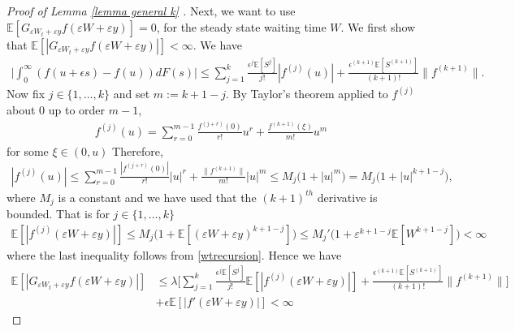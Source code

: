 \documentclass[11pt,letterpaper,reqno]{article}
\theoremstyle{thmstyleone}%
\theoremstyle{thmstyletwo}%
\theoremstyle{thmstylethree}%
\numberwithin{equation}{section}
\begin{document}
\begin{proof}[Proof of Lemma \ref{lemma general k} ]
Next, we want to use $ \mathbb E[G_{\varepsilon W_t+\varepsilon y}f(\varepsilon W+\varepsilon y) ]=0$, for the steady state waiting time $W$. We first show that $ \mathbb E[|G_{\varepsilon W_t+\varepsilon y}f(\varepsilon W+\varepsilon y)| ] < \infty$. We have 
\begin{align*}
    \bigg|\int_0^\infty (f(u+\epsilon s)-f(u)) dF(s) \bigg| \leq \sum_{j=1}^k \frac{\epsilon^j \mathbb E[S^j]}{j!}|f^{(j)}(u)|+\frac{\epsilon^{(k+1)}\mathbb E[S^{(k+1)}]}{(k+1)!}\|f^{(k+1)}\|.
\end{align*} 
Now fix $j\in\{1,\dots,k\}$ and set $m := k+1-j$. By Taylor’s theorem applied to $f^{(j)}$ about $0$ up to order $m-1$,
\begin{align*}  
    f^{(j)}(u)
    = \sum_{r=0}^{m-1} \frac{f^{(j+r)}(0)}{r!}u^r
      + \frac{f^{(k+1)}(\xi)}{m!}u^m
\end{align*}
for some $\xi \in (0,u)$
Therefore,
\begin{align*}
      |f^{(j)}(u)|
    \leq \sum_{r=0}^{m-1} \frac{|f^{(j+r)}(0)|}{r!}|u|^r
         + \frac{\|f^{(k+1)}\|}{m!}|u|^{m}
    \leq M_j\big(1+|u|^{m}\big)
    = M_j\big(1+|u|^{k+1-j}\big),
\end{align*}
where $M_j$ is a constant and we have used that the $(k+1)^{th}$ derivative is bounded.
That is for $j\in\{1,\dots,k\}$
\begin{align*}
    \mathbb E[|f^{(j)}(\varepsilon W+\varepsilon y)|] \leq M_j\big(1+\mathbb E[(\varepsilon W+\varepsilon y
    )^{k+1-j}]\big) \leq M_j'\big(1+\varepsilon^{k+1-j}\mathbb E[ W^{k+1-j}]\big) < \infty
\end{align*}
where the last inequality follows from \eqref{wtrecursion}. Hence we have
\begin{align}\label{generatorbound}
      \mathbb E[|G_{\varepsilon W_t+\varepsilon y}f(\varepsilon W+\varepsilon y)| ] &\leq \lambda \bigg[ \sum_{j=1}^k \frac{\epsilon^j \mathbb E[S^j]}{j!}\mathbb E[|f^{(j)}(\varepsilon W+\varepsilon y)|]+\frac{\epsilon^{(k+1)}\mathbb E[S^{(k+1)}]}{(k+1)!}\|f^{(k+1)}\|\bigg]\\
      &+\epsilon \mathbb E[  |f'(\varepsilon W+\varepsilon y)|]< \infty
\end{align}



\end{proof}
\end{document}
